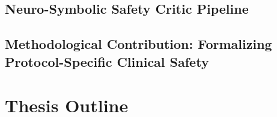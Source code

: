 
\subsection{Neuro-Symbolic Safety Critic Pipeline}


\subsection{Methodological Contribution: Formalizing Protocol-Specific Clinical Safety}


\section{Thesis Outline}

